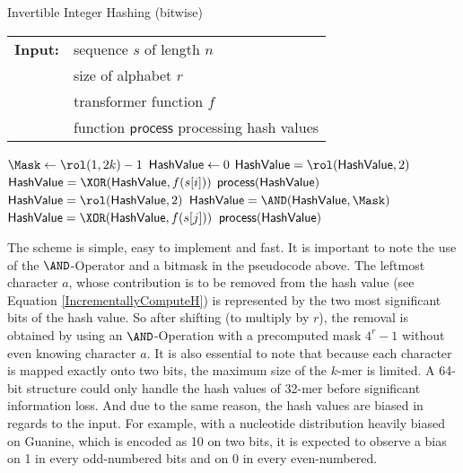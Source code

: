 \begin{algorithm}[t]
\caption{Invertible Integer Hashing (bitwise)}
\label{code:bitwiseinvint}
\begin{tabular}{@{}l@{~}l}
\textbf{Input:}&sequence $s$ of length $n$\\
               &size of alphabet \(r\)\\
               &transformer function \(f\)\\
               &function \(\mathsf{process}\) processing hash values
\end{tabular}
\begin{algorithmic}
\State \(\Mask \gets \rol(1,2k)-1\)
\State \(\mathsf{HashValue} \gets 0\)
\State \(\HashValue = \rol(\HashValue,2)\)
\State \(\HashValue = \XOR(\HashValue,f(s[i]))\)
\EndFor
\State \(\mathsf{process}(\mathsf{HashValue})\)
\State \(\HashValue = \rol(\HashValue,2)\)
\State \(\HashValue = \AND(\HashValue,\Mask)\)
\State \(\HashValue = \XOR(\HashValue,f(s[j]))\)
\State \(\mathsf{process}(\mathsf{HashValue})\)
\EndFor
\end{algorithmic}
\end{algorithm}
The scheme is simple, easy to implement and fast. It is important to note
the use of the \(\AND\)-Operator and a bitmask in the pseudocode above.
The leftmost character \(a\), whose contribution is to be removed from the
hash value (see Equation \ref{IncrementallyComputeH})
is represented by the two most significant bits of the hash value.
So after shifting (to multiply by \(r\)), the removal is obtained
by using an \(\AND\)-Operation with a precomputed mask \(4^{r}-1\)
without even knowing character \(a\).
It is also essential to note that because each character is mapped exactly
onto two bits, the maximum size of the $k$-mer is limited. A 64-bit
structure could only handle the hash values of 32-mer before significant
information loss. And due to the same reason, the hash values are biased in
regards to the input. For example, with a nucleotide distribution heavily
biased on Guanine, which is encoded as 10 on two bits, it is expected to
observe a bias on 1 in every odd-numbered bits and on 0 in every
even-numbered.
